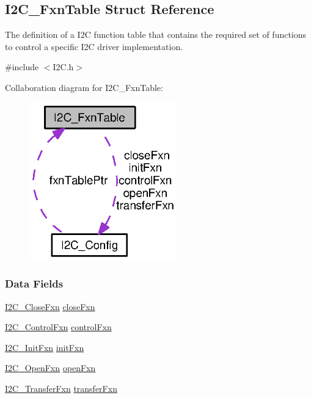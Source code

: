 \subsection{I2\+C\+\_\+\+Fxn\+Table Struct Reference}
\label{struct_i2_c___fxn_table}


The definition of a I2\+C function table that contains the required set of functions to control a specific I2\+C driver implementation.  




{\ttfamily \#include $<$I2\+C.\+h$>$}



Collaboration diagram for I2\+C\+\_\+\+Fxn\+Table\+:
\nopagebreak
\begin{figure}[H]
\begin{center}
\leavevmode
\includegraphics[width=181pt]{struct_i2_c___fxn_table__coll__graph}
\end{center}
\end{figure}
\subsubsection*{Data Fields}
\begin{DoxyCompactItemize}
\item 
\hyperlink{_i2_c_8h_a083200108e980a0ef61e458f0b9fb9e7}{I2\+C\+\_\+\+Close\+Fxn} \hyperlink{struct_i2_c___fxn_table_a02f4e6a7daeb64d6741372a5636eedb5}{close\+Fxn}
\item 
\hyperlink{_i2_c_8h_a4b15853f98d3d5e5135b8c52b8465fff}{I2\+C\+\_\+\+Control\+Fxn} \hyperlink{struct_i2_c___fxn_table_af23db6bdc9b619633fb70ddff44412ea}{control\+Fxn}
\item 
\hyperlink{_i2_c_8h_adfb2451c8a1ce70402e43e4743c5fedf}{I2\+C\+\_\+\+Init\+Fxn} \hyperlink{struct_i2_c___fxn_table_ae27540a7175c9ad14b590ddc92e06390}{init\+Fxn}
\item 
\hyperlink{_i2_c_8h_add24fcdaaf1bdef1521ce2489bf1d80e}{I2\+C\+\_\+\+Open\+Fxn} \hyperlink{struct_i2_c___fxn_table_afb8c5f67ba6d0941f6265707083b16f8}{open\+Fxn}
\item 
\hyperlink{_i2_c_8h_aa785484e689c79262f98208689fecd38}{I2\+C\+\_\+\+Transfer\+Fxn} \hyperlink{struct_i2_c___fxn_table_a16048b22814e3d123f82a7674599b15c}{transfer\+Fxn}
\end{DoxyCompactItemize}


